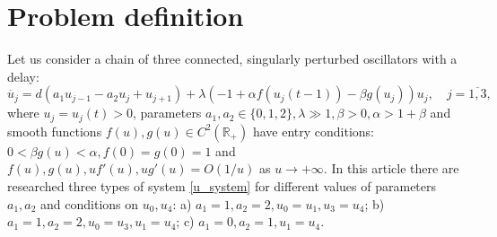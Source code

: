 \documentclass[12pt]{amsart}
\author{ L.\,I.\,Ivanovsky$^{1,2}$ }
\begin{document}
\maketit

\address{
$^1$  Yaroslavl State University, Sovetskaya str., 14, Yaroslavl, 150000, Russia,
$^2$  Scientific Center in Chernogolovka RAS, Lesnaya str., 9, Chernogolovka, Moscow region, 142432, Russia,
}





\section{Problem definition}\label{sec:1}
Let us consider a chain of three connected, singularly perturbed oscillators with a delay:
\begin{equation}\label{u_system} 
	\dot{u_j} = d(a_1u_{j-1}-a_2u_j+u_{j+1})+\lambda(-1+\alpha f(u_j(t-1)) - \beta g(u_j))u_j, \quad j = \overline{1,3},
\end{equation}
where $ u_j = u_j(t) > 0 $, parameters $ a_1, a_2 \in \{ 0, 1, 2 \}, \lambda \gg 1, \beta > 0, \alpha > 1 + \beta $ and smooth functions $ f(u), g(u) \in C^2(\mathbb{R}_+) $ have entry conditions: $ 0 < \beta g(u) < \alpha, f(0) = g(0) = 1 $ and  $ f(u), g(u), uf'(u), ug'(u) = O(1/u) $ as $ u \rightarrow +\infty $. In this article there are researched three types of system \eqref{u_system} for different values of parameters $ a_1, a_2 $ and conditions on $ u_0, u_4 $: a) $ a_1 = 1, a_2 = 2, u_0 = u_1, u_3 = u_4 $; b) $ a_1 = 1, a_2 = 2, u_0 = u_3, u_1 = u_4 $; c) $ a_1 = 0, a_2 = 1, u_1 = u_4 $.
\end{document}

